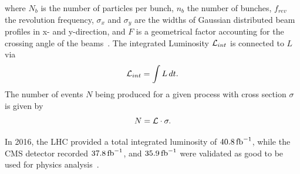 where $N_b$ is the number of particles per bunch, $n_b$ the number of bunches, $f_{rev}$ the revolution frequency, $\sigma_{x}$ and $\sigma_{y}$ are the widths of Gaussian distributed beam profiles in x- and y-direction, and $F$ is a geometrical factor accounting for the crossing angle of the beams~\cite{LuminosityConcept}. The integrated Luminosity $\mathcal{L}_{int}$ is connected to $L$ via
\begin{equation}
 \mathcal{L}_{int}= \int L \,dt.
\end{equation}
The number of events $N$ being produced for a given process with cross section $\sigma$ is given by
\begin{equation}
 N= \mathcal{L} \cdot \sigma.
\end{equation}

In 2016, the LHC provided a total integrated luminosity of $40.8\mbox{\ensuremath{\,\text{fb}^\text{$-$1}}}$, while the CMS detector recorded $37.8\mbox{\ensuremath{\,\text{fb}^\text{$-$1}}}$, and $35.9\mbox{\ensuremath{\,\text{fb}^\text{$-$1}}}$ were validated as good to be used for physics analysis~\cite{DataQuality}.






